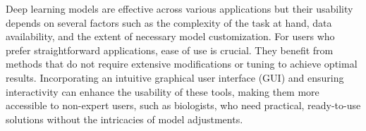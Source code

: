 \documentclass[./dissertation.tex]{subfiles}
\begin{document}
Deep learning models are effective across various applications but their usability depends on several factors such as the complexity of the task at hand, data availability, and the extent of necessary model customization. For users who prefer straightforward applications, ease of use is crucial. They benefit from methods that do not require extensive modifications or tuning to achieve optimal results. Incorporating an intuitive graphical user interface (GUI) and ensuring interactivity can enhance the usability of these tools, making them more accessible to non-expert users, such as biologists, who need practical, ready-to-use solutions without the intricacies of model adjustments.















\end{document}
